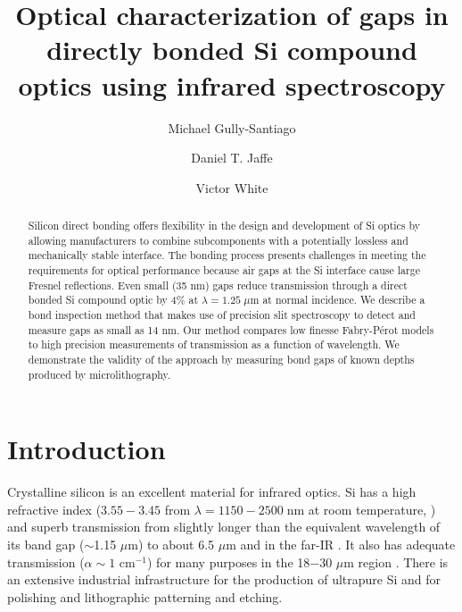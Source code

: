\documentclass[osajnl,twocolumn,showpacs,superscriptaddress,11pt]{revtex4-1} %
\begin{document}
\title{Optical characterization of gaps in directly bonded Si compound optics using infrared spectroscopy}

\author{Michael Gully-Santiago}
\author{Daniel T. Jaffe}

\author{Victor White}


\begin{abstract}
Silicon direct bonding offers flexibility in the design and development of Si optics by allowing manufacturers to combine subcomponents with a potentially lossless and mechanically stable interface. The bonding process presents challenges in meeting the requirements for optical performance because air gaps at the Si interface cause large Fresnel reflections. Even small (35 nm) gaps reduce transmission through a direct bonded Si compound optic by 4\% at $\lambda = 1.25 \; \mu$m at normal incidence.  We describe a bond inspection method that makes use of precision slit spectroscopy to detect and measure gaps as small as 14 nm.  Our method compares low finesse Fabry-P\'{e}rot models to high precision measurements of transmission as a function of wavelength.  We demonstrate the validity of the approach by measuring bond gaps of known depths produced by microlithography.
\end{abstract}


\maketitle %

\section{Introduction}

Crystalline silicon is an excellent material for infrared optics. Si has a high refractive index ($3.55-3.45$ from $\lambda = 1150-2500\;$nm at room temperature, \cite{2006SPIE.6273E..77F}) and superb transmission from slightly longer than the equivalent wavelength of its band gap ($\sim$1.15 $\mu$m) to about 6.5 $\mu$m \cite{PhysRev.108.268, PhysRev.78.178} and in the far-IR \cite{doi:10.1117/12.323764}.  It also has adequate transmission  ($\alpha \sim 1$ cm$^{-1}$) for many purposes in the 18$-$30 $\mu$m region \cite{doi:10.1117/12.323764}.  There is an extensive industrial infrastructure for the production of ultrapure Si and for polishing and lithographic patterning and etching.
\end{document}
